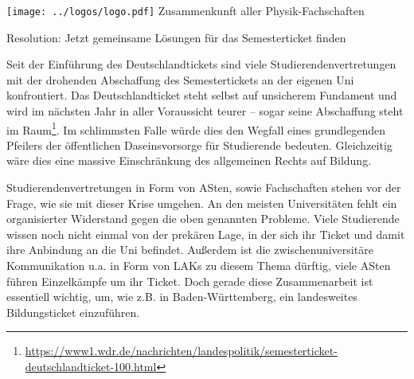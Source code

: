\documentclass[DIV=calc]{scrartcl}
\begin{document}
\hspace{0.87\textwidth}
\begin{minipage}{120pt}
	\vspace{-1.8cm}
	\texttt{[image: ../logos/logo.pdf]}
	\centering
	\small Zusammenkunft aller Physik-Fachschaften
\end{minipage}

\begin{center}
  \huge{Resolution: Jetzt gemeinsame Lösungen für das Semesterticket finden}\vspace{.25\baselineskip}\\
  \normalsize
\end{center}
\vspace{1cm}







Seit der Einführung des Deutschlandtickets sind viele Studierendenvertretungen mit der drohenden Abschaffung des Semestertickets an der eigenen Uni konfrontiert. Das Deutschlandticket steht selbst auf unsicherem Fundament und wird im nächsten Jahr in aller Voraussicht teurer -- sogar seine Abschaffung steht im Raum\footnote{\url{https://www1.wdr.de/nachrichten/landespolitik/semesterticket-deutschlandticket-100.html}}. Im schlimmsten Falle würde dies den Wegfall eines grundlegenden Pfeilers der öffentlichen Daseinsvorsorge für Studierende bedeuten. Gleichzeitig wäre dies eine massive Einschränkung des allgemeinen Rechts auf Bildung.

Studierendenvertretungen in Form von ASten, sowie Fachschaften stehen vor der Frage, wie sie mit dieser Krise umgehen. An den meisten Universitäten fehlt ein organisierter Widerstand gegen die oben genannten Probleme. Viele Studierende wissen noch nicht einmal von der prekären Lage, in der sich ihr Ticket und damit ihre Anbindung an die Uni befindet. Außerdem ist die zwischenuniversitäre Kommunikation u.a. in Form von LAKs zu diesem Thema dürftig, viele ASten führen Einzelkämpfe um ihr Ticket. Doch gerade diese Zusammenarbeit ist essentiell wichtig, um, wie z.B. in Baden-Württemberg, ein landesweites Bildungsticket einzuführen.
\end{document}

